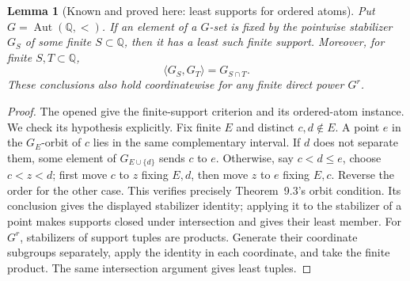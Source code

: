 \documentclass[11pt,a4paper]{article}
\newtheorem{lemma}[theorem]{Lemma}
\theoremstyle{definition}
\begin{document}
\begin{lemma}[Known and proved here: least supports for ordered atoms]\label{E:ordered-supports}
Put $G=\operatorname{Aut}(\mathbb Q,<)$. If an element of a
$G$-set is fixed by the pointwise stabilizer $G_S$ of some finite
$S\subset\mathbb Q$, then it has a least such finite support.
Moreover, for finite $S,T\subset\mathbb Q$,
\[
\langle G_S,G_T\rangle=G_{S\cap T}.
\]
These conclusions also hold coordinatewise for any finite direct
power $G^r$.
\end{lemma}
\begin{proof}
The opened \citet[Theorem~9.3 and Corollary~9.5]{BojanczykKlinLasota2014} give the finite-support criterion and its ordered-atom instance. We check its hypothesis explicitly. Fix finite $E$ and distinct $c,d\notin E$. A point $e$ in the $G_E$-orbit of $c$ lies in the same complementary interval. If $d$ does not separate them, some element of $G_{E\cup\{d\}}$ sends $c$ to $e$. Otherwise, say $c<d\leq e$, choose $c<z<d$; first move $c$ to $z$ fixing $E,d$, then move $z$ to $e$ fixing $E,c$. Reverse the order for the other case. This verifies precisely Theorem~9.3's orbit condition. Its conclusion gives the displayed stabilizer identity; applying it to the stabilizer of a point makes supports closed under intersection and gives their least member. For $G^r$, stabilizers of support tuples are products. Generate their coordinate subgroups separately, apply the identity in each coordinate, and take the finite product. The same intersection argument gives least tuples.
\end{proof}
\end{document}
